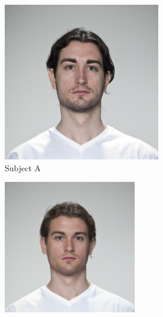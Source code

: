 \documentclass[12pt]{article}
\begin{document}
\begin{figure}[t]
    \centering
    \begin{subfigure}{0.19\textwidth}
        \centering
        \includegraphics[width=\textwidth]{morph_example_A.png}
        \caption{Subject A}
        \label{morph_comp_1}
    \end{subfigure}
    \begin{subfigure}{0.19\textwidth}
        \centering
        \includegraphics[width=\textwidth]{landmark_morph.png}

\end{subfigure}
\end{figure}
\end{document}

